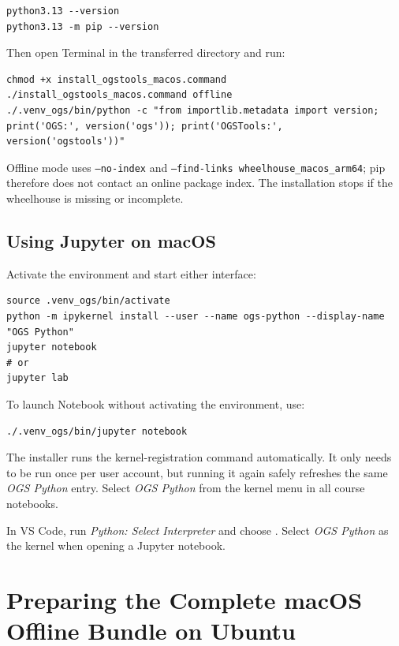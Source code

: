 \documentclass[11pt,a4paper]{tubaf-report}
\begin{document}
\begin{lstlisting}[style=terminal]
python3.13 --version
python3.13 -m pip --version
\end{lstlisting}

Then open Terminal in the transferred directory and run:

\begin{lstlisting}[style=terminal]
chmod +x install_ogstools_macos.command
./install_ogstools_macos.command offline
./.venv_ogs/bin/python -c "from importlib.metadata import version; print('OGS:', version('ogs')); print('OGSTools:', version('ogstools'))"
\end{lstlisting}

Offline mode uses \texttt{--no-index} and
\texttt{--find-links wheelhouse\_macos\_arm64}; pip therefore does not contact
an online package index. The installation stops if the wheelhouse is missing or
incomplete.

\section{Using Jupyter on macOS}

Activate the environment and start either interface:

\begin{lstlisting}[style=terminal]
source .venv_ogs/bin/activate
python -m ipykernel install --user --name ogs-python --display-name "OGS Python"
jupyter notebook
# or
jupyter lab
\end{lstlisting}

To launch Notebook without activating the environment, use:

\begin{lstlisting}[style=terminal]
./.venv_ogs/bin/jupyter notebook
\end{lstlisting}

The installer runs the kernel-registration command automatically. It only
needs to be run once per user account, but running it again safely refreshes the
same \emph{OGS Python} entry. Select \emph{OGS Python} from the kernel menu in
all course notebooks.

In VS Code, run \emph{Python: Select Interpreter} and choose
. Select \emph{OGS Python} as the
kernel when opening a Jupyter notebook.

\chapter{Preparing the Complete macOS Offline Bundle on Ubuntu}
\label{chap:macos-wheelhouse}
\end{document}
